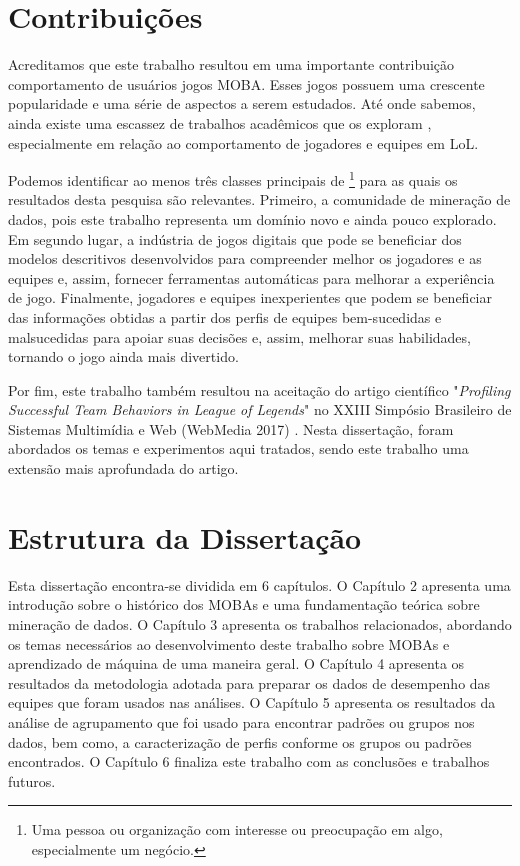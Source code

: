 \section{Contribuições}
Acreditamos que este trabalho resultou em uma importante contribuição  comportamento de usuários  jogos MOBA. Esses jogos possuem uma crescente popularidade e uma série de aspectos a serem estudados. Até onde sabemos, ainda existe uma escassez de trabalhos acadêmicos que os exploram \cite{drachen2014skill} \cite{ong2015player}, especialmente em relação ao comportamento de jogadores e equipes em LoL.

Podemos identificar ao menos três classes principais de \textit{} \footnote{Uma pessoa ou organização com interesse ou preocupação em algo, especialmente um negócio.} para as quais os resultados desta pesquisa são relevantes. Primeiro, a comunidade de mineração de dados, pois este trabalho representa um domínio novo e ainda pouco explorado. Em segundo lugar, a indústria de jogos digitais que pode se beneficiar dos modelos descritivos  desenvolvidos para compreender melhor os jogadores e as equipes e, assim, fornecer ferramentas automáticas para melhorar a experiência de jogo. Finalmente, jogadores e equipes inexperientes que podem se beneficiar das informações obtidas a partir dos perfis de equipes bem-sucedidas e malsucedidas para apoiar suas decisões e, assim, melhorar suas habilidades, tornando o jogo ainda mais divertido.

Por fim, este trabalho também resultou na aceitação do artigo científico "\textit{Profiling Successful Team Behaviors in League of Legends}" no XXIII Simpósio Brasileiro de Sistemas Multimídia e Web (WebMedia 2017) . Nesta disserta\c{c}\~{a}o, foram abordados os temas e experimentos aqui tratados, sendo este trabalho uma extensão mais aprofundada do artigo.

\section{Estrutura da Dissertação}
Esta dissertação encontra-se dividida em 6 capítulos. O Capítulo 2 apresenta uma introdução sobre o histórico dos MOBAs e uma fundamentação teórica sobre mineração de dados. O Capítulo 3 apresenta os trabalhos relacionados, abordando os temas necessários ao desenvolvimento deste trabalho sobre MOBAs e aprendizado de máquina de uma maneira geral. O Capítulo 4 apresenta os resultados da metodologia adotada para preparar os dados de desempenho das equipes que foram usados nas análises. O Capítulo 5 apresenta os resultados da análise de agrupamento que foi usado para encontrar padrões ou grupos nos dados, bem como, a caracterização de perfis conforme os grupos ou padrões encontrados. O Capítulo 6 finaliza este trabalho com as conclusões e trabalhos futuros.

